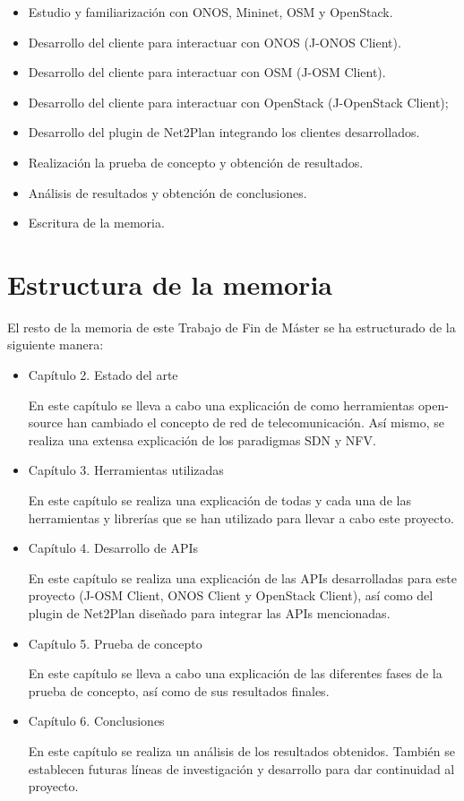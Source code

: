 \begin{itemize}
	\item Estudio y familiarización con ONOS, Mininet, OSM y OpenStack.
	\item Desarrollo del cliente para interactuar con ONOS (J-ONOS Client).
	\item Desarrollo del cliente para interactuar con OSM (J-OSM Client).
	\item Desarrollo del cliente para interactuar con OpenStack (J-OpenStack Client);
	\item Desarrollo del plugin de Net2Plan integrando los clientes desarrollados.
	\item Realización la prueba de concepto y obtención de resultados.
	\item Análisis de resultados y obtención de conclusiones.
	\item Escritura de la memoria.
\end{itemize}

\clearpage

\section{Estructura de la memoria}

El resto de la memoria de este Trabajo de Fin de Máster se ha estructurado de la siguiente manera:
\begin{itemize}

	
	\item Capítulo 2. Estado del arte
	
	En este capítulo se lleva a cabo una explicación de como herramientas open-source han cambiado el concepto de red de telecomunicación. Así mismo, se realiza una extensa explicación de los paradigmas SDN y NFV.
	
	\item Capítulo 3. Herramientas utilizadas
	
	En este capítulo se realiza una explicación de todas y cada una de las herramientas y librerías que se han utilizado para llevar a cabo este proyecto.
	
	\item Capítulo 4. Desarrollo de APIs
	
	En este capítulo se realiza una explicación de las APIs desarrolladas para este proyecto (J-OSM Client, ONOS Client y OpenStack Client), así como del plugin de Net2Plan diseñado para integrar las APIs mencionadas.
	
	\item Capítulo 5. Prueba de concepto
	
	En este capítulo se lleva a cabo una explicación de las diferentes fases de la prueba de concepto, así como de sus resultados finales.
	
	\item Capítulo 6. Conclusiones
	
	En este capítulo se realiza un análisis de los resultados obtenidos. También se establecen futuras líneas de investigación y desarrollo para dar continuidad al proyecto.
	
	
\end{itemize}
\cleardoublepage
	
